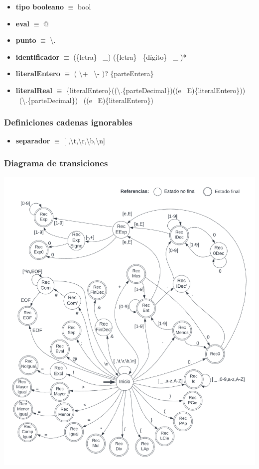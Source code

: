 \documentclass[11pt]{article}
\begin{document}
\begin{itemize}
            \item \textbf{tipo booleano }$\equiv$ bool
            \item \textbf{eval }$\equiv$ @
            \item \textbf{punto }$\equiv$ \textbackslash.
            \item \textbf{identificador }$\equiv$ (\{letra\} \textbar\ \_) (\{letra\} \textbar\ \{dígito\} \textbar\ \_ )*
            \item \textbf{literalEntero }$\equiv$ ( \textbackslash + \textbar\ \textbackslash - )? \{parteEntera\}
            \item \textbf{literalReal }  $\equiv$ \{literalEntero\}((\textbackslash.\{parteDecimal\})((e \textbar\ E)\{literalEntero\})) \textbar\ (\textbackslash.\{parteDecimal\}) \textbar\ ((e \textbar\ E)\{literalEntero\})
        \end{itemize}
        \subsubsection*{Definiciones cadenas ignorables}
        \begin{itemize}
            \item \textbf{separador }$\equiv$ [ ,\textbackslash t,\textbackslash r,\textbackslash b,\textbackslash n]
        \end{itemize}
    \subsubsection{Diagrama de transiciones}
        \includegraphics[width=\paperwidth, angle=90]{tiny0}
\end{document}
